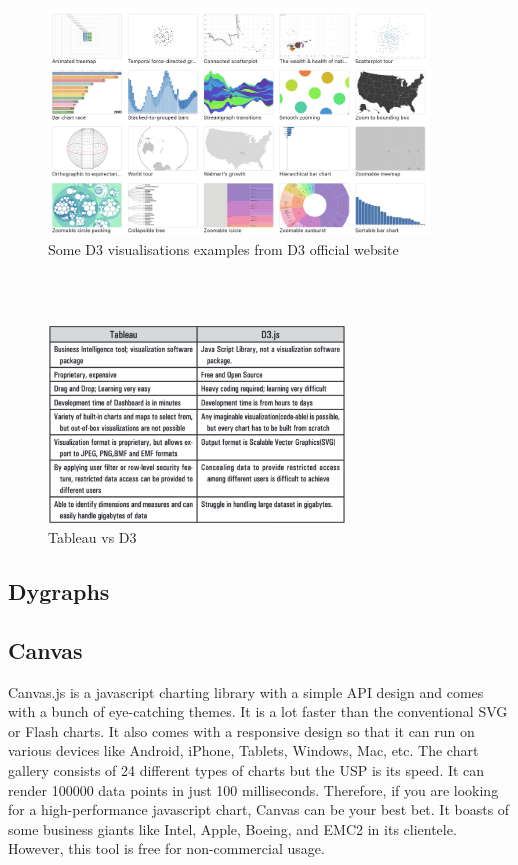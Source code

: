 \begin{figure}[H]
\centering
\captionsetup{justification=centering}
\includegraphics[width=0.9\textwidth]{Report-latex/tex_files/pics/d3.png}
\caption{Some D3 visualisations examples from D3 official website}
\end{figure}

\\\

\begin{figure}[H]
\centering
\captionsetup{justification=centering}
\includegraphics[width=0.7\textwidth]{Report-latex/tex_files/pics/tVd3.png}
\caption{Tableau vs D3 \cite{nair2016interactive}}
\end{figure}

\subsection{Dygraphs}



\subsection{Canvas}
Canvas.js is a javascript charting library with a simple API design and comes with a bunch of eye-catching themes. It is a lot faster than the conventional SVG or Flash charts. It also comes with a responsive design so that it can run on various devices like Android, iPhone, Tablets, Windows, Mac, etc.
The chart gallery consists of 24 different types of charts but the USP is its speed. It can render 100000 data points in just 100 milliseconds. Therefore, if you are looking for a high-performance javascript chart, Canvas can be your best bet. It boasts of some business giants like Intel, Apple, Boeing, and EMC2  in its clientele. However, this tool is free for non-commercial usage.


